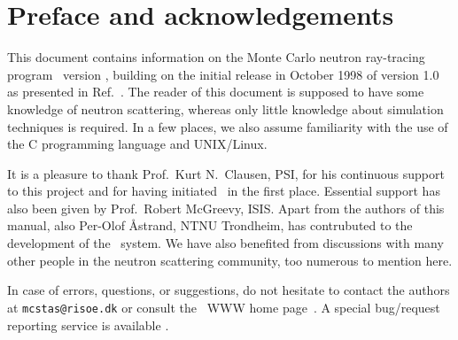 
\chapter*{Preface and acknowledgements}
This document contains information on the Monte Carlo neutron
ray-tracing program \MCS\ version \version, building on the initial
release in October 1998 of version 1.0 as presented in Ref.~\cite{nn_10_20}. The reader of this
document is supposed to have some knowledge of neutron scattering,
whereas only little knowledge about simulation techniques is
required. In a few places, we also assume familiarity with the
use of the C programming language and UNIX/Linux.

It is a pleasure to thank Prof.~Kurt N.~Clausen, PSI, for his continuous
support to this project and for having initiated \MCS\ in the first
place. Essential support has also been given by Prof.~Robert McGreevy, ISIS.
Apart from the authors of this manual, also Per-Olof \AA strand, NTNU Trondheim,
has contrubuted to the development of the \MCS\ system.
We have also benefited
from discussions with many other people in the neutron scattering
community, too numerous to mention here.


In case of errors, questions, or suggestions, 
do not hesitate to
contact the authors at \verb+mcstas@risoe.dk+
or consult the \MCS\ WWW home page~\cite{mcstas_webpage}. 
A special bug/request reporting service is available \cite{mczilla_webpage}.

